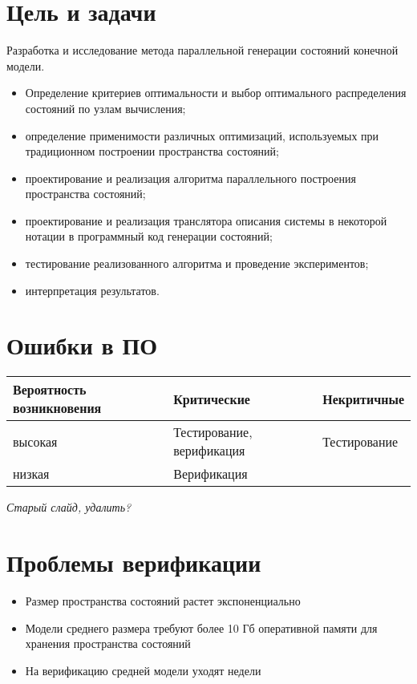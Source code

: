 \documentclass[12pt]{article}
\begin{document}
\TitleSlide

\section{Цель и задачи}
\label{sec:goal-tasks}

\hline
Разработка и исследование метода параллельной генерации состояний конечной модели.
\\
\hline

\small
\begin{itemize}
\item Определение критериев оптимальности и выбор оптимального распределения состояний по
  узлам вычисления;
\item определение применимости различных оптимизаций, используемых при традиционном
  построении пространства состояний;
\item проектирование и реализация алгоритма параллельного построения пространства состояний;
\item проектирование и реализация транслятора описания системы в некоторой нотации в
  программный код генерации состояний;
\item тестирование реализованного алгоритма и проведение экспериментов;
\item интерпретация результатов.
\end{itemize}
\normalsize

\section{Ошибки в ПО}
\label{sec:sw-errors}

\begin{tabular}[ht]{|p{}|p{}|p{}|}
  \hline 
  Вероятность возникновения & Критические & Некритичные \\
  \hline
  высокая & Тестирование, верификация & Тестирование \\
  \hline
  низкая & Верификация & \\
  \hline
\end{tabular}

\textit{Старый слайд, удалить?}

\section{Проблемы верификации}
\label{sec:verif-troubles}

\begin{itemize}
\item Размер пространства состояний растет экспоненциально

\item Модели среднего размера требуют более 10 Гб оперативной памяти для хранения пространства состояний

\item На верификацию средней модели уходят недели
\end{itemize}
\end{document}
